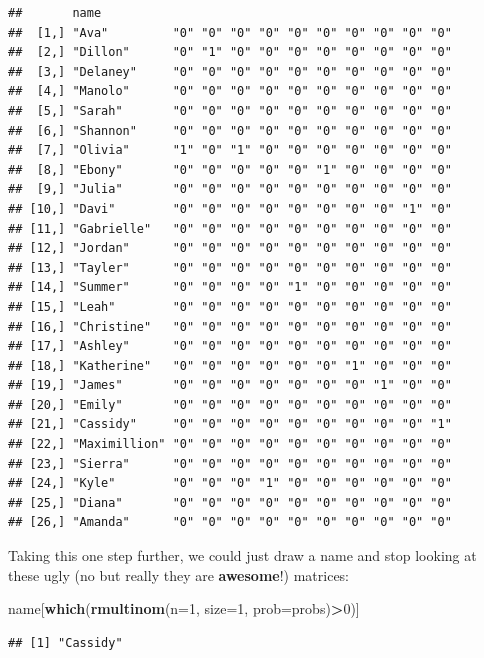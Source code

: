 \documentclass[
]{book}
\newenvironment{Shaded}{\begin{snugshade}}{\end{snugshade}}
\newcommand{\DataTypeTok}[1]{\textcolor[rgb]{0.13,0.29,0.53}{#1}}
\newcommand{\DecValTok}[1]{\textcolor[rgb]{0.00,0.00,0.81}{#1}}
\newcommand{\KeywordTok}[1]{\textcolor[rgb]{0.13,0.29,0.53}{\textbf{#1}}}
\newcommand{\NormalTok}[1]{#1}
\newcommand{\OperatorTok}[1]{\textcolor[rgb]{0.81,0.36,0.00}{\textbf{#1}}}
\begin{document}
\begin{verbatim}
##       name                                                 
##  [1,] "Ava"         "0" "0" "0" "0" "0" "0" "0" "0" "0" "0"
##  [2,] "Dillon"      "0" "1" "0" "0" "0" "0" "0" "0" "0" "0"
##  [3,] "Delaney"     "0" "0" "0" "0" "0" "0" "0" "0" "0" "0"
##  [4,] "Manolo"      "0" "0" "0" "0" "0" "0" "0" "0" "0" "0"
##  [5,] "Sarah"       "0" "0" "0" "0" "0" "0" "0" "0" "0" "0"
##  [6,] "Shannon"     "0" "0" "0" "0" "0" "0" "0" "0" "0" "0"
##  [7,] "Olivia"      "1" "0" "1" "0" "0" "0" "0" "0" "0" "0"
##  [8,] "Ebony"       "0" "0" "0" "0" "0" "1" "0" "0" "0" "0"
##  [9,] "Julia"       "0" "0" "0" "0" "0" "0" "0" "0" "0" "0"
## [10,] "Davi"        "0" "0" "0" "0" "0" "0" "0" "0" "1" "0"
## [11,] "Gabrielle"   "0" "0" "0" "0" "0" "0" "0" "0" "0" "0"
## [12,] "Jordan"      "0" "0" "0" "0" "0" "0" "0" "0" "0" "0"
## [13,] "Tayler"      "0" "0" "0" "0" "0" "0" "0" "0" "0" "0"
## [14,] "Summer"      "0" "0" "0" "0" "1" "0" "0" "0" "0" "0"
## [15,] "Leah"        "0" "0" "0" "0" "0" "0" "0" "0" "0" "0"
## [16,] "Christine"   "0" "0" "0" "0" "0" "0" "0" "0" "0" "0"
## [17,] "Ashley"      "0" "0" "0" "0" "0" "0" "0" "0" "0" "0"
## [18,] "Katherine"   "0" "0" "0" "0" "0" "0" "1" "0" "0" "0"
## [19,] "James"       "0" "0" "0" "0" "0" "0" "0" "1" "0" "0"
## [20,] "Emily"       "0" "0" "0" "0" "0" "0" "0" "0" "0" "0"
## [21,] "Cassidy"     "0" "0" "0" "0" "0" "0" "0" "0" "0" "1"
## [22,] "Maximillion" "0" "0" "0" "0" "0" "0" "0" "0" "0" "0"
## [23,] "Sierra"      "0" "0" "0" "0" "0" "0" "0" "0" "0" "0"
## [24,] "Kyle"        "0" "0" "0" "1" "0" "0" "0" "0" "0" "0"
## [25,] "Diana"       "0" "0" "0" "0" "0" "0" "0" "0" "0" "0"
## [26,] "Amanda"      "0" "0" "0" "0" "0" "0" "0" "0" "0" "0"
\end{verbatim}

Taking this one step further, we could just draw a name and stop looking at these ugly (no but really they are \textbf{awesome}!) matrices:

\begin{Shaded}
\begin{Highlighting}[]
\NormalTok{name[}\KeywordTok{which}\NormalTok{(}\KeywordTok{rmultinom}\NormalTok{(}\DataTypeTok{n=}\DecValTok{1}\NormalTok{, }\DataTypeTok{size=}\DecValTok{1}\NormalTok{, }\DataTypeTok{prob=}\NormalTok{probs)}\OperatorTok{>}\DecValTok{0}\NormalTok{)]}
\end{Highlighting}
\end{Shaded}

\begin{verbatim}
## [1] "Cassidy"
\end{verbatim}
\end{document}
